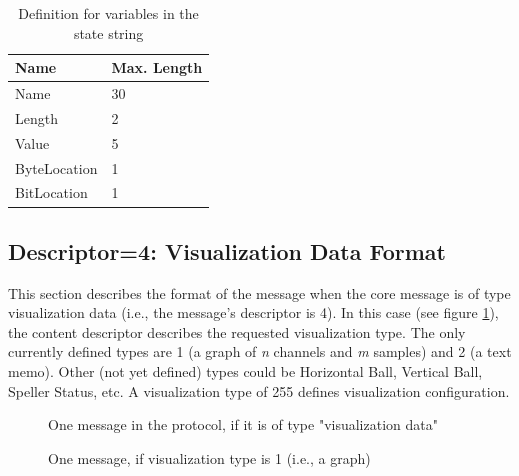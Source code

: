 \documentclass[letterpaper,oneside,12pt]{book}
\begin{document}
\begin{table}[ht]
 \centering
 \begin{tabular}{|l|l|}
  \hline
  \textbf{Name} & \textbf{Max. Length} \\
  \hline
  Name & 30 \\
  \hline
  Length & 2 \\
  \hline
  Value & 5 \\
  \hline
  ByteLocation & 1 \\
  \hline
  BitLocation & 1 \\
  \hline
 \end{tabular}
 \caption{Definition for variables in the state string}
 \label{state_table}
\end{table}   

\subsection{Descriptor=4: Visualization Data Format}
\label{visualizationdata_format}

This section describes the format of the message when the core message is of 
type visualization data (i.e., the message's descriptor is 4). In this case (see 
figure \ref{visualizationprotocol}), the content descriptor describes the 
requested visualization type. The only currently defined types are 1 (a graph of 
\textit{n} channels and \textit{m} samples) and 2 (a text memo). Other (not yet 
defined) types could be Horizontal Ball, Vertical Ball, Speller Status, etc. A 
visualization type of 255 defines visualization configuration.

\begin{figure}[ht]
 \centerline{}
 \caption{One message in the protocol, if it is of type "visualization data"}
 \label{visualizationprotocol}
\end{figure}

\begin{figure}[ht]
 \centerline{}
 \caption{One message, if visualization type is 1 (i.e., a graph)}
 \label{visualizationprotocol_type1}
\end{figure}
\end{document}
